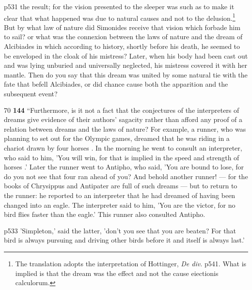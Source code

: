 p531 the result; for the vision presented to the sleeper was such as to make it clear that what happened was due to natural causes and not to the delusion.\texthebrew{}\footnote{The translation adopts the interpretation of Hottinger, \emph{De div.} p541. What is implied is that the dream was the effect and not the cause eiectionis calculorum.

} But by what law of nature did Simonides receive that vision which forbade him to sail? or what was the connexion between the laws of nature and the dream of Alcibiades in which according to history, shortly before his death, he seemed to be enveloped in the cloak of his mistress? Later, when his body had been cast out and was lying unburied and universally neglected, his mistress covered it with her mantle. Then do you say that this dream was united by some natural tie with the fate that befell Alcibiades, or did chance cause both the apparition and the subsequent event?

70
\textbf{144} ``Furthermore, is it not a fact that the conjectures of the interpreters of dreams give evidence of their authors' sagacity rather than afford any proof of a relation between dreams and the laws of nature? For example, a runner, who was planning to set out for the Olympic games, dreamed that he was riding in a chariot drawn by four horses . In the morning he went to consult an interpreter, who said to him, 'You will win, for that is implied in the speed and strength of horses .' Later the runner went to Antipho, who said, 'You are bound to lose, for do you not see that four ran ahead of you? And behold another runner! \texthebrew{—} for the books of Chrysippus and Antipater are full of such dreams \texthebrew{—} but to return to the runner: he reported to an interpreter that he had dreamed of having been changed into an eagle. The interpreter said to him, 'You are the victor, for no bird flies faster than the eagle.' This runner also consulted Antipho.

p533 'Simpleton,' said the latter, 'don't you see that you are beaten? For that bird is always pursuing and driving other birds before it and itself is always last.'

